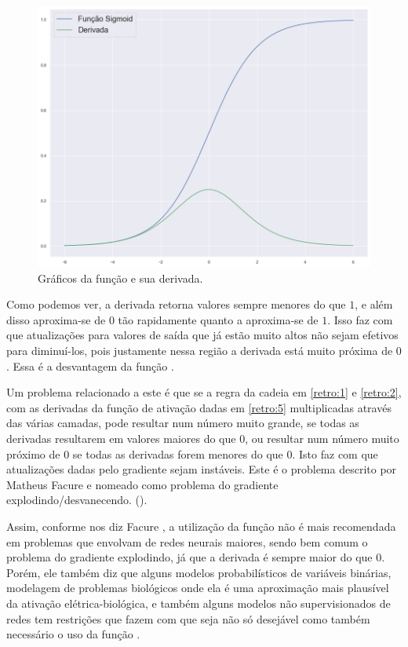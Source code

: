 \begin{figure}[htb]
\centering
\includegraphics[width=12cm]{figuras/der_sigm}
\caption{Gráficos da função  e sua derivada.}
\label{fig:der_sigm}
\end{figure}

Como podemos ver, a derivada retorna valores sempre menores do que $1$, e além disso aproxima-se de $0$ tão rapidamente quanto a  aproxima-se de $1$. Isso faz com que atualizações para valores de saída que já estão muito altos não sejam efetivos para diminuí-los, pois justamente nessa região a derivada está muito próxima de $0$. Essa é a desvantagem da função .

Um problema relacionado a este é que se a regra da cadeia em \ref{retro:1} e \ref{retro:2}, com as derivadas da função de ativação dadas em \ref{retro:5} multiplicadas através das várias camadas, pode resultar num número muito grande, se todas as derivadas resultarem em valores maiores do que $0$, ou resultar num número muito próximo de $0$ se todas as derivadas forem menores do que $0$. Isto faz com que atualizações dadas pelo gradiente sejam instáveis. Este é o problema descrito por Matheus Facure \citep{matheus_2} e nomeado como problema do gradiente explodindo/desvanecendo. ().

Assim, conforme nos diz Facure \citep{matheus}, a utilização da função  não é mais recomendada em problemas que envolvam de redes neurais maiores, sendo bem comum o problema do gradiente explodindo, já que a derivada é sempre maior do que $0$. Porém, ele também diz que alguns modelos probabilísticos de variáveis binárias, modelagem de problemas biológicos onde ela é uma aproximação mais plausível da ativação elétrica-biológica, e também alguns modelos não supervisionados de redes tem restrições que fazem com que seja não só desejável como também necessário o uso da função .

